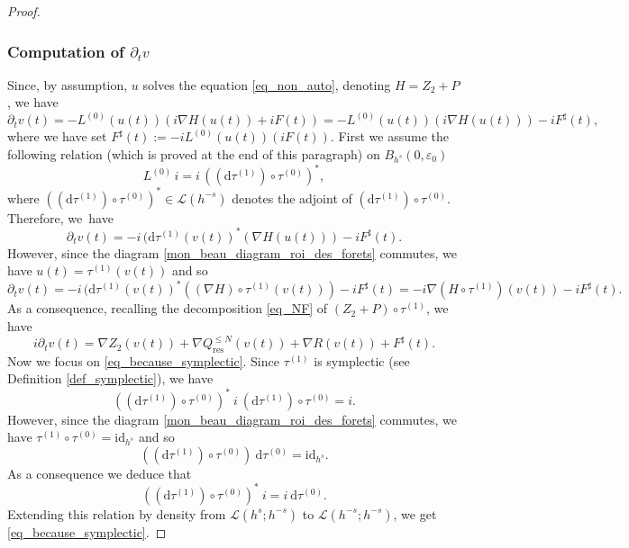 \begin{proof}
\subsubsection*{Computation of $\partial_t v$}
Since, by assumption, $u$ solves the equation \eqref{eq_non_auto}, denoting $H=Z_2+P$, we have
\[
\partial_t v(t) = - L^{(0)}(u(t))(i \nabla H(u(t)) + iF(t)) = - L^{(0)}(u(t))(i \nabla H (u(t))) -i F^\sharp (t),
\]
where we have set $ F^\sharp (t):=-iL^{(0)}(u(t))(iF(t))$. First we assume the following relation (which is proved at the end of this paragraph) on $B_{h^s}(0,\varepsilon_0)$
\begin{equation}
\label{eq_because_symplectic}
L^{(0)} \, i= i \, ((\mathrm{d}\tau^{(1)}) \circ \tau^{(0)})^*,
\end{equation}
where $((\mathrm{d}\tau^{(1)}) \circ \tau^{(0)})^* \in \mathscr{L}(h^{-s})$ denotes the adjoint of $(\mathrm{d}\tau^{(1)}) \circ \tau^{(0)} $. Therefore, we~have
\[
\partial_t v(t) = -i \, (\mathrm{d}\tau^{(1)}(v(t))^*(\nabla H (u(t))) -i F^\sharp (t).
\]
However, since the diagram \eqref{mon_beau_diagram_roi_des_forets} commutes, we have $u(t) = \tau^{(1)} (v(t))$ and so
\[
\partial_t v(t) = -i \, (\mathrm{d}\tau^{(1)}(v(t))^*((\nabla H)\circ \tau^{(1)}(v(t))) -i F^\sharp (t) = -i \nabla (H\circ \tau^{(1)})(v(t)) -i F^\sharp (t).
\]
As a consequence, recalling the decomposition \eqref{eq_NF} of $(Z_2+P)\circ \tau^{(1)}$, we have
\begin{equation}
\label{eq_PDE_for_v}
i\partial_t v(t) = \nabla Z_2(v(t)) + \nabla Q^{\leq N}_{\mathrm{res}}(v(t)) + \nabla R(v(t)) + F^\sharp (t).
\end{equation}
Now we focus on \eqref{eq_because_symplectic}. Since $\tau^{(1)}$ is symplectic (see Definition \ref{def_symplectic}), we have
\[
((\mathrm{d}\tau^{(1)}) \circ \tau^{(0)})^* \ i \ (\mathrm{d}\tau^{(1)}) \circ \tau^{(0)} = i.
\]
However, since the diagram \eqref{mon_beau_diagram_roi_des_forets} commutes, we have $\tau^{(1)} \circ \tau^{(0)} = \mathrm{id}_{h^s}$ and so
\[
((\mathrm{d}\tau^{(1)}) \circ \tau^{(0)}) \ \mathrm{d} \tau^{(0)} = \mathrm{id}_{h^s}.
\]
As a consequence we deduce that
\[
((\mathrm{d}\tau^{(1)}) \circ \tau^{(0)})^* \ i = i \ \mathrm{d} \tau^{(0)}.
\]
Extending this relation by density from $\mathscr{L}(h^s;h^{-s})$ to $\mathscr{L}(h^{-s};h^{-s})$, we get \eqref{eq_because_symplectic}.


\end{proof}
